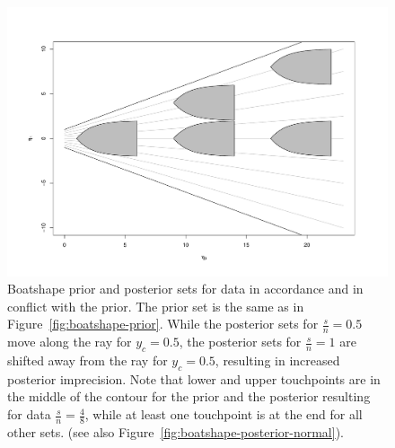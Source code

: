 \begin{figure}  %
\centering
\includegraphics[trim = 15mm 10mm 25mm 25mm, clip, width=\textwidth]{R/boatshape-posterior-mik}
\caption[Boatshape prior and posterior sets for data in accordance and in conflict with the prior.]%
{Boatshape prior and posterior sets for data in accordance and in conflict with the prior.
The prior set is the same as in Figure~\ref{fig:boatshape-prior}.
While the posterior sets for $\frac{s}{n}=0.5$ move along the ray for $y_c=0.5$,
the posterior sets for $\frac{s}{n}=1$ are shifted away from the ray for $y_c=0.5$,
resulting in increased posterior imprecision.
Note that lower and upper touchpoints are in the middle of the contour
for the prior and the posterior resulting for data $\frac{s}{n}=\frac{4}{8}$,
while at least one touchpoint is at the end for all other sets.
(see also Figure~\ref{fig:boatshape-posterior-normal}).}
\label{fig:boatshape-posterior-mik}
\end{figure}


